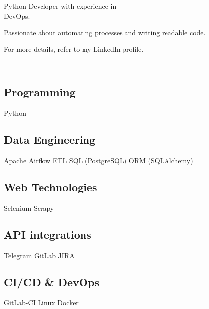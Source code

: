 \documentclass[a4paper]{MagicalCV}
\begin{document}
\lastupdated


\begin{minipage}[t]{0.33\textwidth} 


Python Developer with experience in \\DevOps.

Passionate about automating processes and writing readable code.

For more details, refer to my LinkedIn profile.
\sectionsep

\\



\sectionsep


\subsection{Programming}
Python

\subsection{Data Engineering}
Apache Airflow \textbullet{} 
ETL \textbullet{} 
SQL (PostgreSQL) \textbullet{} 
ORM (SQLAlchemy)

\subsection{Web Technologies}
Selenium \textbullet{} 
Scrapy

\subsection{API integrations}
Telegram \textbullet{} 
GitLab \textbullet{} 
JIRA

\subsection{CI/CD \& DevOps}
GitLab-CI \textbullet{} 
Linux \textbullet{} 
Docker
\sectionsep


\end{minipage}
\end{document}
